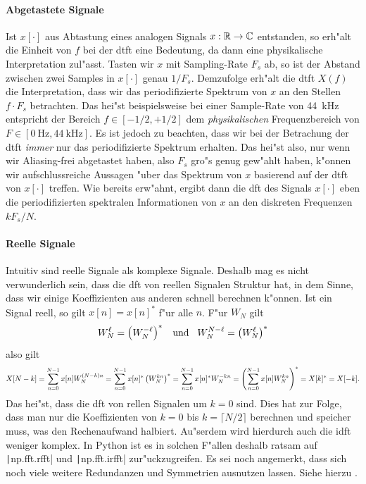 \paragraph{Abgetastete Signale}\label{par:fourier:sampled_sig}
%
Ist $x[\cdot]$ aus Abtastung eines analogen Signals $x: \mathbb{R} \rightarrow \mathbb{C}$ entstanden, so erh"alt die Einheit von $f$ bei der \gls{dtft} eine Bedeutung, da dann  eine physikalische Interpretation zul"asst.
Tasten wir $x$ mit Sampling-Rate $F_s$ ab, so ist der Abstand zwischen zwei Samples in $x[\cdot]$ genau $1/F_s$.
Demzufolge erh"alt die \gls{dtft} $X(f)$ die Interpretation, dass wir das periodifizierte Spektrum von $x$ an den Stellen $f \cdot F_s$ betrachten.
Das hei"st beispielsweise bei einer Sample-Rate von \SI{44}{\kilo\hertz} entspricht der Bereich $f \in [-1/2,+1/2]$ dem \emph{physikalischen} Frequenzbereich von $F \in [\SI{0}{\hertz},\SI{44}{\kilo\hertz}]$.
Es ist jedoch zu beachten, dass wir bei der Betrachung der \gls{dtft} \emph{immer} nur das periodifizierte Spektrum erhalten. 
Das hei"st also, nur wenn wir Aliasing-frei abgetastet haben, also $F_s$ gro"s genug gew"ahlt haben, k"onnen wir aufschlussreiche Aussagen "uber das Spektrum von $x$ basierend auf der \gls{dtft} von $x[\cdot]$ treffen.
Wie bereits erw"ahnt, ergibt dann die \gls{dft} des Signals $x[\cdot]$ eben die periodifizierten spektralen Informationen von $x$ an den diskreten Frequenzen $k F_s/N$.
%
%
\paragraph{Reelle Signale}
%
Intuitiv sind reelle Signale  als komplexe Signale. 
Deshalb mag es nicht verwunderlich sein, dass die \gls{dft} von reellen Signalen Struktur hat, in dem Sinne, dass wir einige Koeffizienten aus anderen schnell berechnen k"onnen.
Ist ein Signal reell, so gilt $x[n] = x[n]^\ast$ f"ur alle $n$.
F"ur $W_N$ gilt 
\[
W_N^\ell = \left(W_N^{-\ell}\right)^\ast
{\hspace{3mm} \text{und} \hspace{3mm}}
W_N^{N-\ell} = \left(W_N^{\ell}\right)^\ast
\]
also gilt
\[
X[N-k] 
    = {\sum\limits_{n=0}^{N-1}{x[n] W_N^{(N - k) n}}}
    = {\sum\limits_{n=0}^{N-1}{x[n]^\ast \left(W_N^{k n}\right)^\ast}}
    = {\sum\limits_{n=0}^{N-1}{x[n]^\ast W_N^{-k n}}}
    = \left({\sum\limits_{n=0}^{N-1}{x[n] W_N^{k n}}}\right)^\ast
    = X[k]^\ast
    = X[-k].
\]
Das hei"st, dass die \gls{dft} von rellen Signalen  um $k=0$ sind.
Dies hat zur Folge, dass man nur die Koeffizienten von $k=0$ bis $k = \lceil N/2 \rceil$ berechnen und speicher muss, was den Rechenaufwand halbiert.
Au"serdem wird hierdurch auch die \gls{idft} weniger komplex.
In Python ist es in solchen F"allen deshalb ratsam auf \texttt|np.fft.rfft| und \texttt|np.fft.irfft| zur"uckzugreifen.
Es sei noch angemerkt, dass sich noch viele weitere Redundanzen und Symmetrien ausnutzen lassen.
Siehe hierzu \cite[Kap. 7.2.1]{proakis2013}.
%
%
